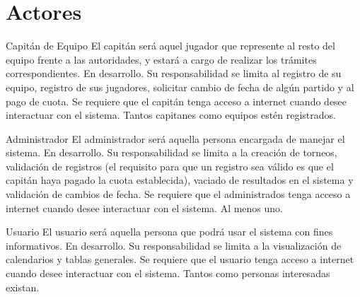 \section{Actores}

\begin{Actor}{Capitán de Equipo} 
	\BRitem[Descripción:] El capitán será aquel jugador que represente al resto del equipo frente a las autoridades, y estará a cargo de realizar los trámites correspondientes.
	\BRitem[Estatus:] En desarrollo.
	\BRitem[Responsabilidades:] Su responsabilidad se limita al registro de su equipo,  registro de sus jugadores, solicitar cambio de fecha de algún partido y al pago de cuota.
	\BRitem[Perfil:] Se requiere que el capitán tenga acceso a internet cuando desee interactuar con el sistema.
	\BRitem[Cantidad:] Tantos capitanes como equipos estén registrados.
\end{Actor}

\begin{Actor}{Administrador} 
	\BRitem[Descripción:] El administrador será aquella persona encargada de manejar el sistema.
	\BRitem[Estatus:] En desarrollo.
	\BRitem[Responsabilidades:] Su responsabilidad se limita a la creación de torneos, validación de registros (el requisito para que un registro sea válido es que el capitán haya pagado la cuota establecida), vaciado de resultados en el sistema y validación de cambios de fecha.
	\BRitem[Perfil:] Se requiere que el administrados tenga acceso a internet cuando desee interactuar con el sistema.
	\BRitem[Cantidad:] Al menos uno.
\end{Actor}

\begin{Actor}{Usuario} 
	\BRitem[Descripción:] El usuario será aquella persona que podrá usar el sistema con fines informativos.
	\BRitem[Estatus:] En desarrollo.
	\BRitem[Responsabilidades:] Su responsabilidad se limita a la visualización de calendarios y tablas generales.
	\BRitem[Perfil:] Se requiere que el usuario tenga acceso a internet cuando desee interactuar con el sistema.
	\BRitem[Cantidad:] Tantos como personas interesadas existan.
\end{Actor}